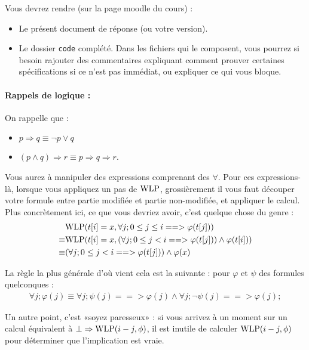 \documentclass[11pt,answers]{exam}
\begin{document}
Vous devrez rendre (sur la page moodle du cours) :
\begin{itemize}
    \item Le présent document de réponse (ou votre version).
    \item Le dossier \texttt{code} complété. Dans les fichiers qui le composent, vous pourrez si besoin rajouter des commentaires expliquant comment prouver certaines spécifications si ce n’est pas immédiat, ou expliquer ce qui vous bloque.
\end{itemize}


\paragraph{Rappels de logique :}

On rappelle que :
\begin{itemize}
    \item $p \Rightarrow q \equiv \neg p \vee q$
    \item $(p \wedge q) \Rightarrow r \equiv p \Rightarrow q \Rightarrow r$.
\end{itemize}

Vous aurez à manipuler des expressions comprenant des $\forall$. Pour ces expressions-là, lorsque vous appliquez un pas de $\mathrm{WLP}$, grossièrement il vous faut découper votre formule entre partie modifiée et partie non-modifiée, et appliquer le calcul. Plus concrètement ici, ce que vous devriez avoir, c’est quelque chose du genre :
\begin{align*}
    & \mathrm{WLP}(t[i] = x,\forall j; 0 \leq j \leq i ==> \varphi(t[j]))\\
    \equiv & \mathrm{WLP}(t[i] = x,(\forall j; 0 \leq j < i ==> \varphi(t[j])) \wedge \varphi(t[i]))\\
    \equiv & (\forall j; 0 \leq j < i ==> \varphi(t[j])) \wedge \varphi(x)
\end{align*}

La règle la plus générale d’où vient cela est la suivante : pour $\varphi$ et $\psi$ des formules quelconques :
\begin{align*}
    \forall j; \varphi(j) \equiv \forall j; \psi(j) ==> \varphi(j) \wedge \forall j; \neg \psi(j) ==> \varphi(j);
\end{align*}

Un autre point, c’est «soyez paresseux» : si vous arrivez à un moment sur un calcul équivalent à $\bot \Rightarrow \mathrm{WLP}(i-j,\phi)$, il est inutile de calculer $\mathrm{WLP}(i-j,\phi)$ pour déterminer que l’implication est vraie.
\end{document}
